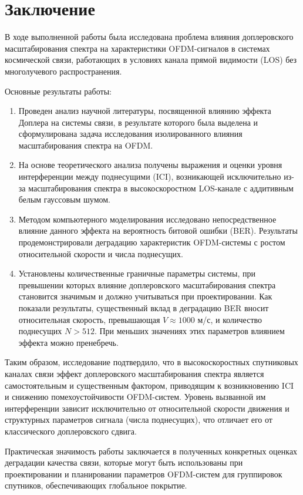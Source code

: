 \newpage
\section{Заключение}

В ходе выполненной работы была исследована проблема влияния доплеровского масштабирования спектра
на характеристики OFDM-сигналов в системах космической связи,
работающих в условиях канала прямой видимости (LOS) без многолучевого распространения.

Основные результаты работы:
\begin{enumerate}
\item Проведен анализ научной литературы, посвященной влиянию эффекта Доплера на системы связи,
      в результате которого была выделена и сформулирована задача исследования изолированного
      влияния масштабирования спектра на OFDM.
\item На основе теоретического анализа получены выражения
      и оценки уровня интерференции между поднесущими (ICI),
      возникающей исключительно из-за масштабирования спектра
      в высокоскоростном LOS-канале с аддитивным белым гауссовым шумом.
\item Методом компьютерного моделирования исследовано непосредственное
      влияние данного эффекта на вероятность битовой ошибки (BER).
      Результаты продемонстрировали деградацию характеристик OFDM-системы 
      с ростом относительной скорости и числа поднесущих.
\item Установлены количественные граничные параметры системы,
      при превышении которых влияние доплеровского масштабирования
    спектра становится значимым и должно учитываться при проектировании. Как показали результаты, существенный вклад в деградацию BER вносит относительная скорость, превышающая $V \approx 1000$ м/с, и количество поднесущих $N > 512$. При меньших значениях этих параметров влиянием эффекта можно пренебречь.
\end{enumerate}

Таким образом, исследование подтвердило, что в высокоскоростных спутниковых каналах связи эффект доплеровского масштабирования спектра является самостоятельным и существенным фактором, приводящим к возникновению ICI и снижению помехоустойчивости OFDM-систем. Уровень вызванной им интерференции зависит исключительно от относительной скорости движения и структурных параметров сигнала (числа поднесущих), что отличает его от классического доплеровского сдвига.

Практическая значимость работы заключается в полученных конкретных оценках деградации качества связи, которые могут быть использованы при проектировании и планировании параметров OFDM-систем для группировок спутников, обеспечивающих глобальное покрытие.